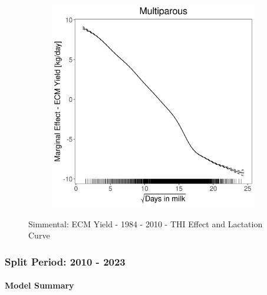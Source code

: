 \begin{figure}[H]
\begin{subfigure}[b]{0.45\textwidth}
    \end{subfigure}
    \hspace{0.05\textwidth} %
    \begin{subfigure}[b]{0.45\textwidth}
        \centering
        \includegraphics[width=\textwidth]{thesis/figures/models/ecm/before2010/si_ecm_before2010/si_ecm_before2010_marginal_dim_milk_multi.png}
    \end{subfigure}
    \caption[]{Simmental: ECM Yield - 1984 - 2010 - THI Effect and Lactation Curve}
    \label{fig:main}
\end{figure}

\subsubsection{Split Period: 2010 - 2023}\label{model:si_ecm_after}

\paragraph{Model Summary} \quad \\



